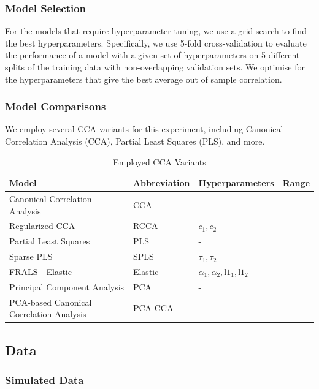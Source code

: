 \subsubsection{Model Selection}

For the models that require hyperparameter tuning, we use a grid search to find the best hyperparameters.
Specifically, we use 5-fold cross-validation to evaluate the performance of a model with a given set of hyperparameters on 5 different splits of the training data with non-overlapping validation sets.
We optimise for the hyperparameters that give the best average out of sample correlation.

\subsubsection{Model Comparisons}
We employ several CCA variants for this experiment, including Canonical Correlation Analysis (CCA), Partial Least Squares (PLS), and more.

\begin{table}[h]
\centering
\caption{Employed CCA Variants}
\begin{tabular}{|l|l|l|l|}
\hline
\textbf{Model} & \textbf{Abbreviation} & \textbf{Hyperparameters} & \textbf{Range} \\
\hline
Canonical Correlation Analysis & CCA & - &  \\
\hline
Regularized CCA & RCCA & \(c_1, c_2\) &  \\
\hline
Partial Least Squares & PLS & - &  \\
\hline
Sparse PLS & SPLS & \(\tau_1, \tau_2\) &  \\
\hline
FRALS - Elastic & Elastic & \(\alpha_1, \alpha_2, \text{l1}_1, \text{l1}_2\) &  \\
\hline
Principal Component Analysis & PCA & - & \\
\hline
PCA-based Canonical Correlation Analysis & PCA-CCA & - &  \\
\hline
\end{tabular}
\label{table:cca-variants}
\end{table}

\subsection{Data}

\subsubsection{Simulated Data}

